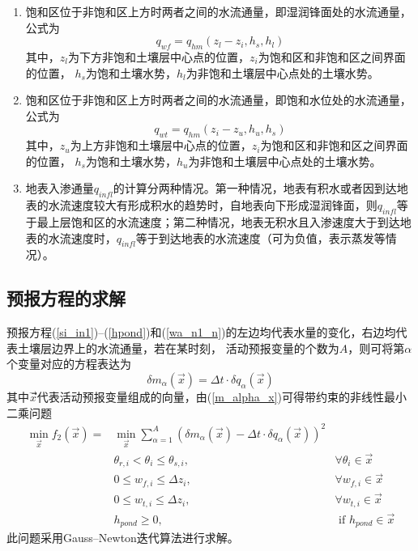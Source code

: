 \begin{enumerate}
    \item 饱和区位于非饱和区上方时两者之间的水流通量，即湿润锋面处的水流通量，公式为
    \begin{equation}
    q_{wf}=q_{h m}\left(z_{l}-z_{i}, h_{s}, h_{l}\right)
    \end{equation}
    其中，$z_l$为下方非饱和土壤层中心点的位置，$z_i$为饱和区和非饱和区之间界面的位置，
    $h_s$为饱和土壤水势，$h_l$为非饱和土壤层中心点处的土壤水势。

    \item 饱和区位于非饱和区上方时两者之间的水流通量，即饱和水位处的水流通量，公式为
    \begin{equation}
    q_{wt}=q_{h m}\left(z_{i}-z_{u}, h_{u}, h_{s}\right)
    \end{equation}
    其中，$z_u$为上方非饱和土壤层中心点的位置，$z_i$为饱和区和非饱和区之间界面的位置，
    $h_s$为饱和土壤水势，$h_u$为非饱和土壤层中心点处的土壤水势。

    \item 地表入渗通量$q_{infl}$的计算分两种情况。第一种情况，地表有积水或者因到达地表的水流速度较大有形成积水的趋势时，自地表向下形成湿润锋面，则$q_{infl}$等于最上层饱和区的水流速度；第二种情况，地表无积水且入渗速度大于到达地表的水流速度时，$q_{infl}$等于到达地表的水流速度（可为负值，表示蒸发等情况）。
    
\end{enumerate}


\subsection{预报方程的求解}
预报方程(\ref{si_in1})--(\ref{hpond})和(\ref{wa_n1_n})的左边均代表水量的变化，右边均代表土壤层边界上的水流通量，若在某时刻，
活动预报变量的个数为$A$，则可将第$\alpha$个变量对应的方程表达为
\begin{equation}\label{m_alpha_x}
\delta m_{\alpha}(\vec{x})=\Delta t \cdot \delta q_{\alpha}(\vec{x})
\end{equation}
其中$\vec{x}$⃗代表活动预报变量组成的向量，由(\ref{m_alpha_x})可得带约束的非线性最小二乘问题
\begin{equation}
\begin{aligned}
\min _{\vec{x}} f_{2}(\vec{x})=& \min _{\vec{x}} \sum_{\alpha=1}^{A}\left(\delta m_{\alpha}(\vec{x})-\Delta t \cdot \delta q_{\alpha}(\vec{x})\right)^{2} \\ 
& \theta_{r, i}<\theta_{i} \leqslant \theta_{s, i}, & \forall \theta_{i} \in \vec{x} \\ 
& 0 \leqslant w_{f, i} \leqslant \Delta z_{i},               & \forall w_{f, i} \in \vec{x} \\ 
& 0 \leqslant w_{t, i} \leqslant \Delta z_{i},               & \forall w_{t, i} \in \vec{x} \\ 
& h_{ {pond }} \geqslant 0,                               & \text{ if } h_{ {pond }} \in \vec{x} 
\end{aligned}
\end{equation}
此问题采用Gauss--Newton迭代算法进行求解。

